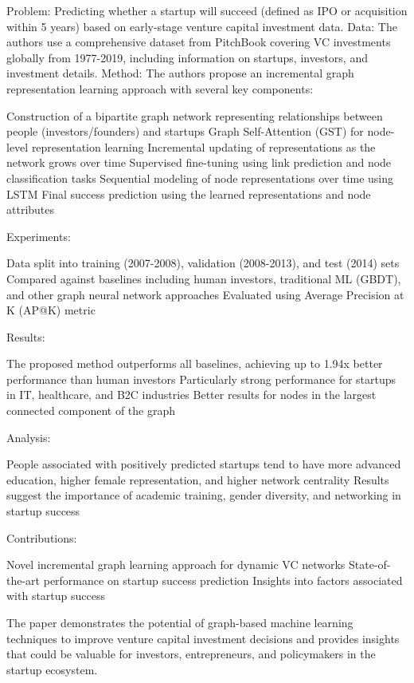 \documentclass[a4paper, oneside]{discothesis}
\begin{document}
Problem: Predicting whether a startup will succeed (defined as IPO or acquisition within 5 years) based on early-stage venture capital investment data.
Data: The authors use a comprehensive dataset from PitchBook covering VC investments globally from 1977-2019, including information on startups, investors, and investment details.
Method: The authors propose an incremental graph representation learning approach with several key components:

Construction of a bipartite graph network representing relationships between people (investors/founders) and startups
Graph Self-Attention (GST) for node-level representation learning
Incremental updating of representations as the network grows over time
Supervised fine-tuning using link prediction and node classification tasks
Sequential modeling of node representations over time using LSTM
Final success prediction using the learned representations and node attributes


Experiments:

Data split into training (2007-2008), validation (2008-2013), and test (2014) sets
Compared against baselines including human investors, traditional ML (GBDT), and other graph neural network approaches
Evaluated using Average Precision at K (AP@K) metric


Results:

The proposed method outperforms all baselines, achieving up to 1.94x better performance than human investors
Particularly strong performance for startups in IT, healthcare, and B2C industries
Better results for nodes in the largest connected component of the graph


Analysis:

People associated with positively predicted startups tend to have more advanced education, higher female representation, and higher network centrality
Results suggest the importance of academic training, gender diversity, and networking in startup success


Contributions:

Novel incremental graph learning approach for dynamic VC networks
State-of-the-art performance on startup success prediction
Insights into factors associated with startup success



The paper demonstrates the potential of graph-based machine learning techniques to improve venture capital investment decisions and provides insights that could be valuable for investors, entrepreneurs, and policymakers in the startup ecosystem.
\end{document}
